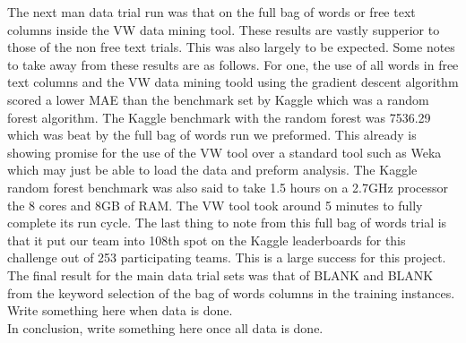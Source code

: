 The next man data trial run was that on the full bag of words or free text columns inside the VW data mining tool.
These results are vastly supperior to those of the non free text trials. This was also largely to be expected. Some
notes to take away from these results are as follows. For one, the use of all words in free text columns and the
VW data mining toold using the gradient descent algorithm scored a lower MAE than the benchmark set by Kaggle
which was a random forest algorithm. The Kaggle benchmark with the random forest was 7536.29 which was beat
by the full bag of words run we preformed. This already is showing promise for the use of the VW tool over a standard
tool such as Weka which may just be able to load the data and preform analysis. The Kaggle random forest benchmark
was also said to take 1.5 hours on a 2.7GHz processor the 8 cores and 8GB of RAM. The VW tool took around 5 minutes
to fully complete its run cycle. The last thing to note from this full bag of words trial is that it put our
team into 108th spot on the Kaggle leaderboards for this challenge out of 253 participating teams. This is a large
success for this project.\\

The final result for the main data trial sets was that of BLANK and BLANK from the keyword selection of the bag
of words columns in the training instances. Write something here when data is done.\\

In conclusion, write something here once all data is done.